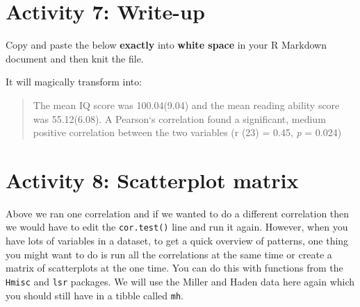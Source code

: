 \documentclass[]{book}
\newenvironment{Shaded}{\begin{snugshade}}{\end{snugshade}}
\newcommand{\DataTypeTok}[1]{\textcolor[rgb]{0.13,0.29,0.53}{#1}}
\newcommand{\DecValTok}[1]{\textcolor[rgb]{0.00,0.00,0.81}{#1}}
\newcommand{\KeywordTok}[1]{\textcolor[rgb]{0.13,0.29,0.53}{\textbf{#1}}}
\newcommand{\NormalTok}[1]{#1}
\newcommand{\OperatorTok}[1]{\textcolor[rgb]{0.81,0.36,0.00}{\textbf{#1}}}
\newcommand{\StringTok}[1]{\textcolor[rgb]{0.31,0.60,0.02}{#1}}
\begin{document}
\hypertarget{activity-7-write-up}{%
\section{Activity 7: Write-up}\label{activity-7-write-up}}

Copy and paste the below \textbf{exactly} into \textbf{white space} in your R Markdown document and then knit the file.

\begin{Shaded}
\end{Shaded}

It will magically transform into:

\begin{quote}
The mean IQ score was 100.04(9.04) and the mean reading ability score was 55.12(6.08). A Pearson`s correlation found a significant, medium positive correlation between the two variables (r (23) = 0.45, \emph{p} = 0.024)
\end{quote}

\hypertarget{activity-8-scatterplot-matrix}{%
\section{Activity 8: Scatterplot matrix}\label{activity-8-scatterplot-matrix}}

Above we ran one correlation and if we wanted to do a different correlation then we would have to edit the \texttt{cor.test()} line and run it again. However, when you have lots of variables in a dataset, to get a quick overview of patterns, one thing you might want to do is run all the correlations at the same time or create a matrix of scatterplots at the one time. You can do this with functions from the \texttt{Hmisc} and \texttt{lsr} packages. We will use the Miller and Haden data here again which you should still have in a tibble called \texttt{mh}.
\end{document}
